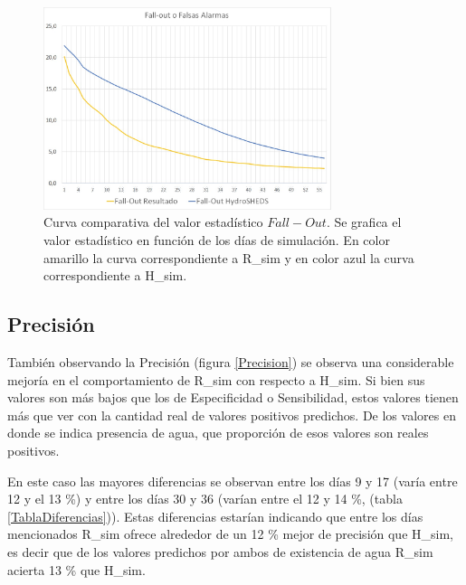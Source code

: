 \documentclass[10pt,a4paper, twoside]{report}
\begin{document}
\begin{figure}[H]
   \centering      
   \includegraphics[width=0.75\textwidth]{imagenes/fallout.jpg}
 \caption{Curva comparativa del valor estadístico $Fall-Out$. Se grafica el valor estadístico en función de los días de simulación. En color amarillo la curva correspondiente a R\_sim y en color azul la curva correspondiente a H\_sim.}
 \label{fallout}
\end{figure}



\subsection{Precisión}

También observando la Precisión (figura \ref{Precision}) se observa una considerable mejoría en el comportamiento de R\_sim con respecto a H\_sim. Si bien sus valores son más bajos que los de Especificidad o Sensibilidad, estos valores tienen más que ver con la cantidad real de valores positivos predichos. De los valores en donde se indica presencia de agua, que proporción de esos valores son reales positivos.

En este caso las mayores diferencias se observan entre los días 9 y 17 (varía entre 12 y el 13 \%) y entre los días 30 y 36 (varían entre el 12 y 14 \%, (tabla \ref{TablaDiferencias})). Estas diferencias estarían indicando que entre los días mencionados R\_sim ofrece alrededor de un 12 \% mejor de precisión que H\_sim, es decir que de los valores predichos por ambos de existencia de agua R\_sim acierta 13 \% que H\_sim.
\end{document}
